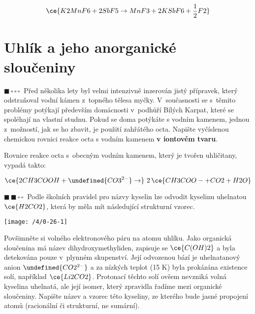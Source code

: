\documentclass{book}
\let\ch\undefined
\newcommand{\jeden}{$\blacksquare \, \square \, \square \, \square \; \; $}
\newcommand{\dva}{$\blacksquare \, \blacksquare \, \square \, \square \; \; $}
\renewenvironment{quotation}{\par}{\par} %
\begin{document}
\[
\ce{K2MnF6 + 2 SbF5 \rightarrow MnF3 + 2 KSbF6 + \frac12 F2}
\]

\section{Uhlík a jeho anorganické sloučeniny}

\begin{quotation}
\jeden Před několika lety byl velmi intenzivně inzerován jistý přípravek,
který odstraňoval vodní kámen z~topného tělesa myčky. V~současnosti
se s~těmito problémy potýkají především domácnosti v~podhůří Bílých
Karpat, které se spoléhají na vlastní studnu. Pokud se doma potýkáte
s vodním kamenem, jednou z~možností, jak se ho zbavit, je použití
zahřátého octa. Napište vyčíslenou chemickou rovnici reakce octa s
vodním kamenem \textbf{v iontovém tvaru}.
\end{quotation} \dotfill \par 
Rovnice reakce octa s~obecným vodním kamenem, který je tvořen uhličitany, vypadá takto:

\[
\ce{2CH3COOH + \ch{CO3^{2-}} \rightarrow} \ 2\, \ce{CH3COO- + CO2 + H2O}
\]

\newpage %
\begin{quotation}
\dva Podle školních pravidel pro názvy kyselin lze odvodit kyselinu uhelnatou
$\ce{H2CO2}$, která by měla mít následující strukturní vzorec.
\begin{center}

\texttt{[image: /4/0-26-1]}

\par\end{center}
Povšimněte si volného elektronového páru na atomu uhlíku. Jako organická
sloučenina má název dihydroxymethyliden, zapisuje se $\ce{C(OH)2}$ a byla detekována pouze v~plynném skupenství. Její
odvozenou bází je uhelnatanový anion \(\ch{CO2^{2-}}\) a za nízkých
teplot (15 K) byla prokázána existence solí, například $\ce{Li2CO2}$.
Protonací těchto solí ovšem nevzniká volná kyselina uhelnatá, ale
její isomer, který zpravidla řadíme mezi organické sloučeniny. Napište
název a vzorec této kyseliny, ze kterého bude jasné propojení atomů (racionální či strukturní, ne sumární).
\end{quotation} \dotfill \par 
\end{document}

